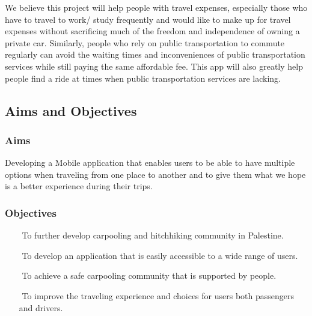 \documentclass[a4paper, 12pt]{report} %
\begin{document}
            We believe this project will help people with travel expenses, especially those who have to travel to work/ study frequently and would like to make up for travel expenses without sacrificing much of the freedom and independence of owning a private car. Similarly, people who rely on public transportation to commute regularly can avoid the waiting times and inconveniences of public transportation services while still paying the same affordable fee. This app will also greatly help people find a ride at times when public transportation services are lacking. 
            
        \subsection{Aims and Objectives}
            \subsubsection{Aims}
                Developing a Mobile application that enables users to be able to have multiple options when traveling from one place to another and to give them what we hope is a better experience during their trips.
                
            \subsubsection{Objectives}
                \begin{itemize}
                    \item [$ $] To further develop carpooling and hitchhiking community in Palestine.
                     \item [$ $] To develop an application that is easily accessible to a wide range of users.
                     \item [$ $] To achieve a safe carpooling community that is supported by people.
                     \item [$ $] To improve the traveling experience and choices for users both passengers and drivers.
                \end{itemize}
\end{document}
